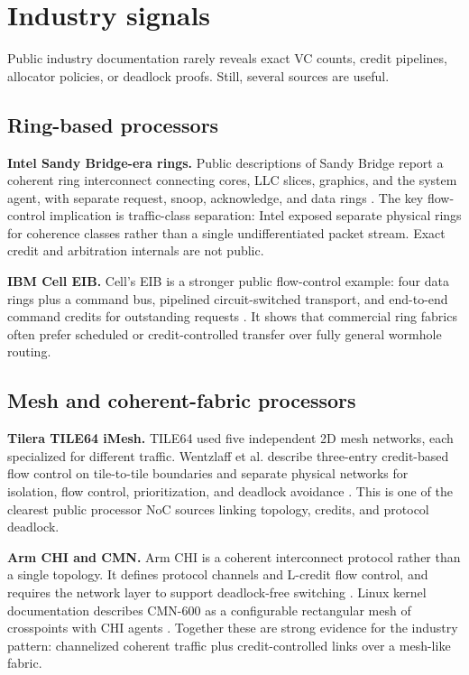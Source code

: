 \documentclass[11pt]{article}
\newcommand{\term}[1]{\textbf{#1}}
\begin{document}
\section{Industry signals}

Public industry documentation rarely reveals exact VC counts, credit pipelines, allocator policies, or deadlock proofs. Still, several sources are useful.

\subsection{Ring-based processors}

\term{Intel Sandy Bridge-era rings.} Public descriptions of Sandy Bridge report a coherent ring interconnect connecting cores, LLC slices, graphics, and the system agent, with separate request, snoop, acknowledge, and data rings \cite{Kanter2010Sandy}. The key flow-control implication is traffic-class separation: Intel exposed separate physical rings for coherence classes rather than a single undifferentiated packet stream. Exact credit and arbitration internals are not public.

\term{IBM Cell EIB.} Cell's EIB is a stronger public flow-control example: four data rings plus a command bus, pipelined circuit-switched transport, and end-to-end command credits for outstanding requests \cite{Ainsworth2006Cell}. It shows that commercial ring fabrics often prefer scheduled or credit-controlled transfer over fully general wormhole routing.

\subsection{Mesh and coherent-fabric processors}

\term{Tilera TILE64 iMesh.} TILE64 used five independent 2D mesh networks, each specialized for different traffic. Wentzlaff et al. describe three-entry credit-based flow control on tile-to-tile boundaries and separate physical networks for isolation, flow control, prioritization, and deadlock avoidance \cite{Wentzlaff2007Tilera}. This is one of the clearest public processor NoC sources linking topology, credits, and protocol deadlock.

\term{Arm CHI and CMN.} Arm CHI is a coherent interconnect protocol rather than a single topology. It defines protocol channels and L-credit flow control, and requires the network layer to support deadlock-free switching \cite{ArmCHI2021}. Linux kernel documentation describes CMN-600 as a configurable rectangular mesh of crosspoints with CHI agents \cite{LinuxCMN2023}. Together these are strong evidence for the industry pattern: channelized coherent traffic plus credit-controlled links over a mesh-like fabric.
\end{document}
